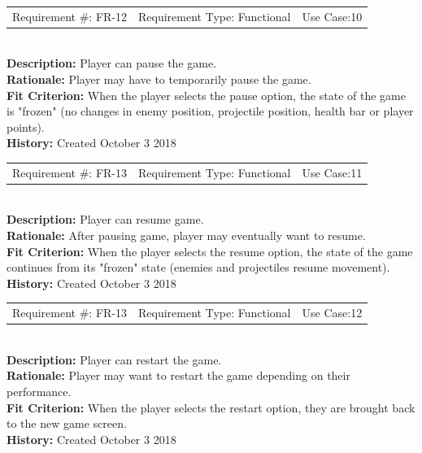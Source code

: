 \documentclass[12pt, titlepage]{article}
\begin{document}
\begin{reqbox}
	\begin{tabular}{c|c|c}
		Requirement \#: FR-12 & Requirement Type: Functional & Use Case:10 \\
	\end{tabular} \\
	\textbf{Description:} Player can pause the game. \\
	\textbf{Rationale:} Player may have to temporarily pause the game. \\
	\textbf{Fit Criterion:} When the player selects the pause option, the state of the game is "frozen" (no changes in enemy position, projectile position, health bar or player points). \\
	\textbf{History:} Created October 3 2018
\end{reqbox}

\begin{reqbox}
	\begin{tabular}{c|c|c}
		Requirement \#: FR-13 & Requirement Type: Functional & Use Case:11 \\
	\end{tabular} \\
	\textbf{Description:} Player can resume game. \\
	\textbf{Rationale:} After pausing game, player may eventually want to resume. \\
	\textbf{Fit Criterion:} When the player selects the resume option, the state of the game continues from its "frozen" state (enemies and projectiles resume movement). \\
	\textbf{History:} Created October 3 2018
\end{reqbox}

\begin{reqbox}
	\begin{tabular}{c|c|c}
		Requirement \#: FR-13 & Requirement Type: Functional & Use Case:12 \\
	\end{tabular} \\
	\textbf{Description:} Player can restart the game. \\
	\textbf{Rationale:} Player may want to restart the game depending on their performance. \\
	\textbf{Fit Criterion:} When the player selects the restart option, they are brought back to the new game screen. \\
	\textbf{History:} Created October 3 2018
\end{reqbox}
\end{document}
